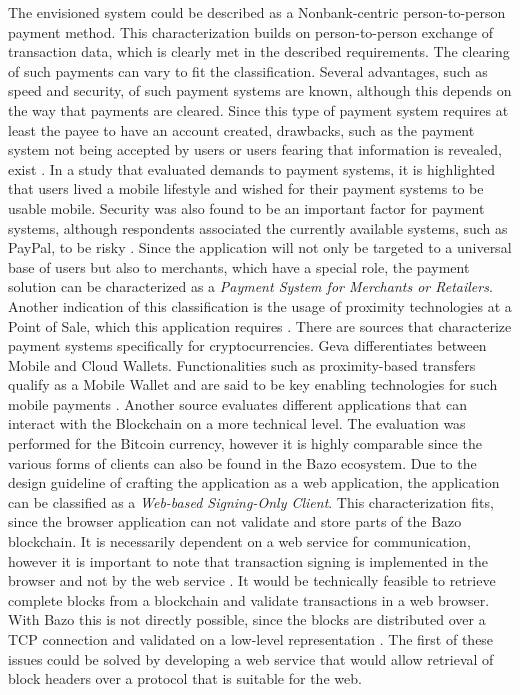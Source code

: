 The envisioned system could be described as a Nonbank-centric person-to-person payment method. This characterization builds on person-to-person exchange of transaction data, which is clearly met in the described requirements. The clearing of such payments can vary to fit the classification.
Several advantages, such as speed and security, of such payment systems are known, although this depends on the way that payments are cleared. Since this type of payment system requires at least the payee to have an account created, drawbacks, such as the payment system not being accepted by users or users fearing that information is revealed, exist \cite{p2ppayments}.
In a study that evaluated demands to payment systems, it is highlighted that users lived a mobile lifestyle and wished for their payment systems to be usable mobile. Security was also found to be an important factor for payment systems, although respondents associated the currently available systems, such as PayPal, to be risky \cite{p2ppadoption}.
Since the application will not only be targeted to a universal base of users but also to merchants, which have a special role, the payment solution can be characterized as a  \textit{Payment System for Merchants or Retailers}.
Another indication of this classification is the usage of proximity technologies at a Point of Sale, which this application requires \cite{p2ptypes}.
There are sources that characterize payment systems specifically for cryptocurrencies. Geva differentiates between Mobile and Cloud Wallets. Functionalities such as proximity-based transfers qualify as a Mobile Wallet and are said to be key enabling technologies for such mobile payments \cite{bitcoinmobile}.
Another source evaluates different applications that can interact with the Blockchain on a more technical level. The evaluation was performed for the Bitcoin currency, however it is highly comparable since the various forms of clients can also be found in the Bazo ecosystem.
Due to the design guideline of crafting the application as a web application, the application can be classified as a \textit{ Web-based Signing-Only Client}. This characterization fits, since the browser application can not validate and store parts of the Bazo blockchain. It is necessarily dependent on a web service for communication, however it is important to note that transaction signing is implemented in the browser and not by the web service \cite{bitcoinclients}. It would be technically feasible to retrieve complete blocks from a blockchain and validate transactions in a web browser. With Bazo this is not directly possible, since the blocks are distributed over a TCP connection and validated on a low-level representation \cite{lisg}. The first of these issues could be solved by developing a web service that would allow retrieval of block headers over a protocol that is suitable for the web.
